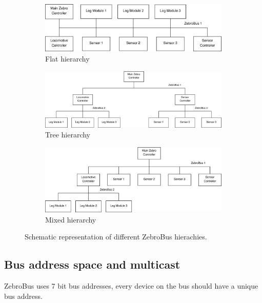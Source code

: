 \begin{figure}[htpb]
        \centering
        \begin{subfigure}[htpb]{\textwidth}
                \centering
                \includegraphics[scale=0.28]{fig/zebrobus_flat.eps}
                \caption{Flat hierarchy}
                \label{fig:ch3trace}     
        \end{subfigure}
        \begin{subfigure}[htpb]{\textwidth}
                \centering
                \includegraphics[scale=0.26]{fig/zebrobus_tree.eps}
                \caption{Tree hierarchy}
                \label{fig:ch3carPlotTree}
        \end{subfigure}
        \begin{subfigure}[htpb]{\textwidth}
        \centering
        \includegraphics[scale=0.28]{fig/zebrobus_mixed.eps}
        \caption{Mixed hierarchy}
         \label{fig:ch3carPlotMixed}
        \end{subfigure}
        \caption{Schematic representation of different ZebroBus hierachies.}\label{fig:zebrobus_hierachies}
\end{figure}

\subsection{Bus address space and multicast}
ZebroBus uses 7 bit bus addresses, every device on the bus should have a unique bus address.

